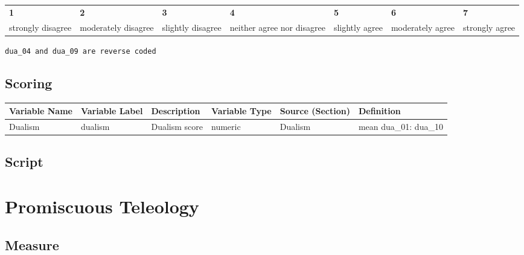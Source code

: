 \documentclass[
  letterpaper,
]{scrbook}
\begin{document}
\begin{longtable}[]{@{}
  >{\raggedright\arraybackslash}p{}
  >{\raggedright\arraybackslash}p{}
  >{\raggedright\arraybackslash}p{}
  >{\raggedright\arraybackslash}p{}
  >{\raggedright\arraybackslash}p{}
  >{\raggedright\arraybackslash}p{}
  >{\raggedright\arraybackslash}p{}@{}}
\toprule\noalign{}
\endhead
\bottomrule\noalign{}
\endlastfoot
\textbf{1} & \textbf{2} & \textbf{3} & \textbf{4} & \textbf{5} &
\textbf{6} & \textbf{7} \\
strongly disagree & moderately disagree & slightly disagree & neither
agree nor disagree & slightly agree & moderately agree & strongly
agree \\
\end{longtable}

\texttt{dua\_04\ and\ dua\_09\ are\ reverse\ coded}

\section{Scoring}\label{scoring-12}

\begin{tabu} to 
\toprule
Variable Name & Variable Label & Description & Variable Type & Source (Section) & Definition\\
\midrule
Dualism & dualism & Dualism score & numeric & Dualism & mean dua\_01: dua\_10\\
\bottomrule
\end{tabu}

\section{Script}\label{script}

\chapter{Promiscuous Teleology}\label{promiscuous-teleology}

\section{Measure}\label{measure-13}
\end{document}
